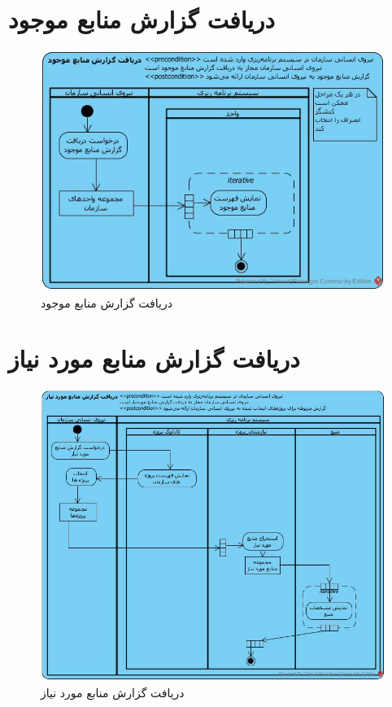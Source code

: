 \section{دریافت گزارش منابع موجود}
\begin{figure}[H]
	\centering
	\includegraphics[scale=0.7]{img/activity/AvailableResourcesReport}
	\caption{دریافت گزارش منابع موجود}
\end{figure}


\section{دریافت گزارش منابع مورد نیاز}
\begin{figure}[H]
	\centering
	\includegraphics[scale=0.6]{img/activity/RequiredResourcesReport}
	\caption{دریافت گزارش منابع مورد نیاز}
\end{figure}

